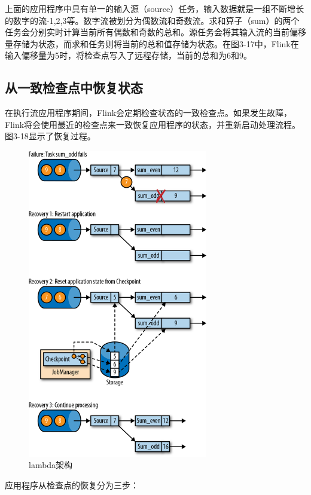\documentclass[cn,11pt,chinese]{elegantbook}
\begin{document}
上面的应用程序中具有单一的输入源（source）任务，输入数据就是一组不断增长的数字的流-1,2,3等。数字流被划分为偶数流和奇数流。求和算子（sum）的两个任务会分别实时计算当前所有偶数和奇数的总和。源任务会将其输入流的当前偏移量存储为状态，而求和任务则将当前的总和值存储为状态。在图3-17中，Flink在输入偏移量为5时，将检查点写入了远程存储，当前的总和为6和9。

\subsection{从一致检查点中恢复状态}

在执行流应用程序期间，Flink会定期检查状态的一致检查点。如果发生故障，Flink将会使用最近的检查点来一致恢复应用程序的状态，并重新启动处理流程。图3-18显示了恢复过程。

\begin{figure}[htbp]
    \centering
    \includegraphics[width=0.7\textwidth]{images/spaf_0318.png}
    \caption{lambda架构}
\end{figure}

应用程序从检查点的恢复分为三步：
\end{document}
